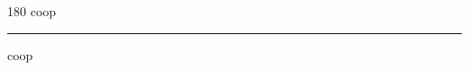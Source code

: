 
\begin{frame}
\begin{center}
\begin{turn}{180}
{\fontsize{2.5cm}{1em}\selectfont coop}
\end{turn}
\vspace{1em}\par  
\hrule
\vspace{1em}\par  
{\fontsize{2.5cm}{1em}\selectfont coop}
\end{center}
\end{frame}
